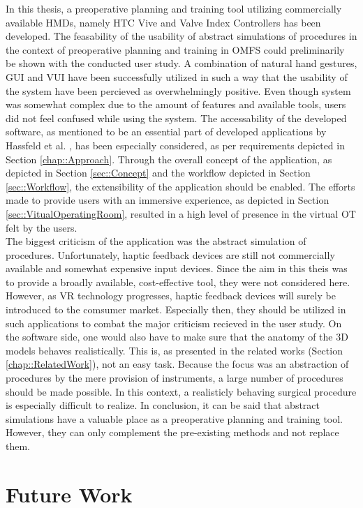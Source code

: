 In this thesis, a preoperative planning and training tool utilizing
commercially available HMDs, namely HTC Vive and Valve Index Controllers
has been developed. The feasability of the usability of 
abstract simulations of procedures in the context of preoperative planning
and training in OMFS could preliminarily be shown with the 
conducted user study. 
A combination of natural hand gestures, GUI and VUI have been
successfully utilized in such a way that the usability
of the system have been percieved as overwhelmingly positive.
Even though system was somewhat complex due to the amount of features 
and available tools, users did not feel confused while using the 
system.
The accessability of the developed software, 
as mentioned to be an essential part of developed applications by
Hassfeld et al. \cite{HASSFELD20012}, has been especially considered,
as per requirements depicted in Section \ref{chap::Approach}.
Through the overall concept of the application, as depicted in Section 
\ref{sec::Concept} and the workflow depicted in Section \ref{sec::Workflow},
the extensibility of the application should be enabled. 
The efforts made to provide users with an immersive experience,
as depicted in Section \ref{sec::VitualOperatingRoom},
resulted in a high level of presence in the virtual OT felt by the users.
\\ The biggest criticism of the application was the abstract 
simulation of procedures. Unfortunately, haptic feedback devices are still
not commercially available and somewhat expensive input devices. Since
the aim in this theis was to provide a broadly available, cost-effective
tool, they were not considered here. However, as VR technology progresses,
haptic feedback devices will surely be introduced to the comsumer market.
Especially then, they should be utilized in such applications to combat
the major criticism recieved in the user study.
On the software side, one would also have to make sure that 
the anatomy of the 3D models behaves realistically. This is, as 
presented in the related works (Section \ref{chap::RelatedWork}), 
not an easy task. 
Because the focus was an abstraction of procedures by the mere provision 
of instruments, a large number of procedures should be made possible.
In this context, a realisticly behaving surgical procedure is
especially difficult to realize.
In conclusion, it can be said that abstract simulations have a valuable
place as a preoperative planning and training tool. However, they 
can only complement the pre-existing methods and not replace them.
 
\section{Future Work}






